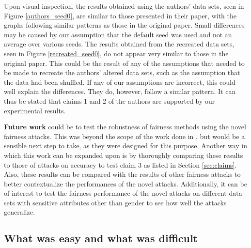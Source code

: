 Upon visual inspection, the results obtained using the authors' data sets, seen in Figure \ref{authors_seed0}, are similar to those presented in their paper, with the graphs following similar patterns as those in the original paper. Small differences may be caused by our assumption that the default seed was used and not an average over various seeds.
The results obtained from the recreated data sets, seen in Figure \ref{recreated_seed0}, do not appear very similar to those in the original paper. This could be the result of any of the assumptions that needed to be made to recreate the authors' altered data sets, such as the assumption that the data had been shuffled. If any of our assumptions are incorrect, this could well explain the differences. They do, however, follow a similar pattern. It can thus be stated that claims 1 and 2 of the authors are supported by our experimental results.

\textbf{Future work} could be to test the robustness of fairness methods using the novel fairness attacks. This was beyond the scope of the work done in \cite{mehrabi2020exacerbating}, but would be a sensible next step to take, as they were designed for this purpose.
Another way in which this work can be expanded upon is by thoroughly comparing these results to those of attacks on accuracy to test claim 3 as listed in Section \ref{sec:claims}. Also, these results can be compared with the results of other fairness attacks to better contextualize the performances of the novel attacks.
Additionally, it can be of interest to test the fairness performance of the novel attacks on different data sets with sensitive attributes other than gender to see how well the attacks generalize.

\subsection{What was easy and what was difficult}

